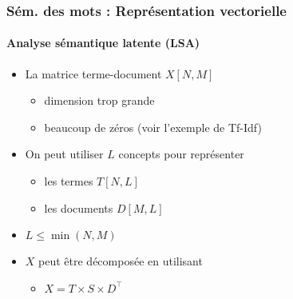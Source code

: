 \documentclass[xcolor=table]{beamer}
\begin{document}
\begin{frame}
\frametitle{Sém. des mots : Représentation vectorielle}
\framesubtitle{Analyse sémantique latente (LSA)}

\begin{itemize}
	\item La matrice terme-document $X[N, M]$ 
	\begin{itemize}
		\item dimension trop grande
		\item beaucoup de zéros (voir l'exemple de Tf-Idf)
	\end{itemize}
	\item On peut utiliser $L$ concepts pour représenter
	\begin{itemize}
		\item les termes $T[N, L]$
		\item les documents $D[M, L]$
	\end{itemize}
	\item $L \le \min(N, M)$
	\item $X$ peut être décomposée en utilisant 
	\begin{itemize}
		\item $X = T \times S \times D^\top$
	\end{itemize}
\end{itemize}

\end{frame}
\end{document}

